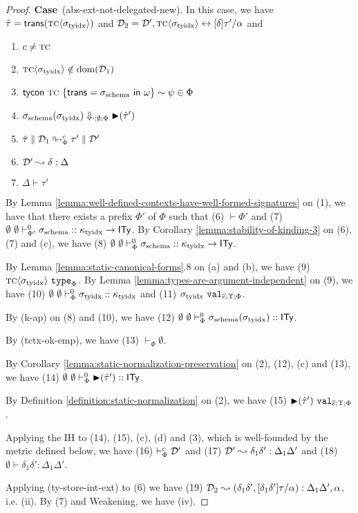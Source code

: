 \documentclass[12pt]{article}
\newcommand{\pfcase}[1]{\textbf{Case}~#1. }
\begin{document}
\begin{proof}
\pfcase{(abs-ext-not-delegated-new)} In this case, we have $\qity=\srep{\sty{\tc}{\sttyidx}}$ and $\memD_2=\memD', \sty{\tc}{\sttyidx} \leftrightarrow [\delta]\tau'/\alpha$  and \begin{enumerate}[(1)]
    \item $c\neq\tc$
    \item $\sty{\tc}{\sttyidx} \notin \text{dom}(\memD_1)$
    \item $\tcdef{\tc}{\psi}{\tcstruct{\stx{schema}}{\omega}} \in \Phi$
    \item $\stx{schema}(\stx{tyidx}) \Downarrow_{\cdot;\emptyset;\Phi} \sqity{\qity'}$
    \item $\tdeabs{\Phi}{c}{\qity}{\memD_1}{\tau'}{\memD'}$
    \item $\memD' \leadsto \delta : \Delta$
    \item $\Delta \vdash \tau'$
\end{enumerate}
By Lemma \ref{lemma:well-defined-contexts-have-well-formed-signatures} on (1), we have that there exists a prefix $\Phi'$ of $\Phi$ such that (6) $\vdash \Phi'$ and (7) $\sofkz{\emptyset}{\emptyset}{\Phi'}{\stx{schema}}{\ktyidx \rightarrow \kity}$. By Corollary \ref{lemma:stability-of-kinding-3} on (6), (7) and (c), we have (8) $\sofkz{\emptyset}{\emptyset}{\Phi}{\stx{schema}}{\ktyidx \rightarrow \kity}$.

By Lemma \ref{lemma:static-canonical-forms}.8 on (a) and (b), we have (9) $\istype{\sty{\tc}{\sttyidx}}{\Phi}$. By Lemma \ref{lemma:types-are-argument-independent} on (9), we have (10) $\sofkVXz{\sttyidx}{\ktyidx}$ and (11) $\sval{\sttyidx}{\es;\Upsilon;\Phi}$.

By (k-ap) on (8) and (10), we have (12) $\sofkVXz{\stx{schema}(\sttyidx)}{\kity}$.

By (tctx-ok-emp), we have (13) $\vdash_\Phi \emptyset$.

By Corollary \ref{lemma:static-normalization-preservation} on (2), (12), (c) and (13), we have (14) $\sofkVXz{\sqity{\qity'}}{\kity}$.

By Definition \ref{definition:static-normalization} on (2), we have (15) $\sval{\sqity{\qity'}}{\es;\Upsilon;\Phi}$. 

Applying the IH to (14), (15), (c), (d) and (3), which is well-founded by the metric defined below, we have (16) $\tytsvX{\memD'}$ and (17) $\memD' \leadsto \delta_1\delta' : \Delta_1\Delta'$ and (18) $\emptyset \vdash \delta_1\delta' : \Delta_1\Delta'$.

Applying (ty-store-int-ext) to (6) we have (19) $\memD_2 \leadsto (\delta_1\delta', [\delta_1\delta']\tau/\alpha) : \Delta_1\Delta', \alpha$, i.e. (ii).  By (7) and Weakening, we have (iv).


\end{proof}
\end{document}
